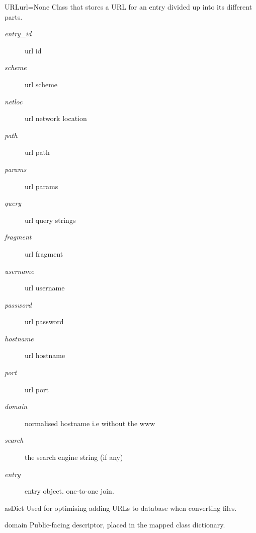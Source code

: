 \documentclass[letterpaper,10pt,english]{manual}
\begin{document}
\hypertarget{webscavator.model.models.URL}{}\begin{classdesc}{URL}{url=None}
Class that stores a URL for an entry divided up into its different parts.
\begin{description}
\item[\emph{entry\_id}]
url id

\item[\emph{scheme}]
url scheme

\item[\emph{netloc}]
url network location

\item[\emph{path}]
url path

\item[\emph{params}]
url params

\item[\emph{query}]
url query strings

\item[\emph{fragment}]
url fragment

\item[\emph{username}]
url username

\item[\emph{password}]
url password

\item[\emph{hostname}]
url hostname

\item[\emph{port}]
url port

\item[\emph{domain}]
normalised hostname i.e without the www

\item[\emph{search}]
the search engine string (if any)

\item[\emph{entry}]
entry object. one-to-one join.

\end{description}

\hypertarget{webscavator.model.models.URL.asDict}{}\begin{methoddesc}{asDict}{}
Used for optimising adding URLs to database when converting files.
\end{methoddesc}

\hypertarget{webscavator.model.models.URL.domain}{}\begin{memberdesc}{domain}
Public-facing descriptor, placed in the mapped class dictionary.
\end{memberdesc}


\end{classdesc}
\end{document}
